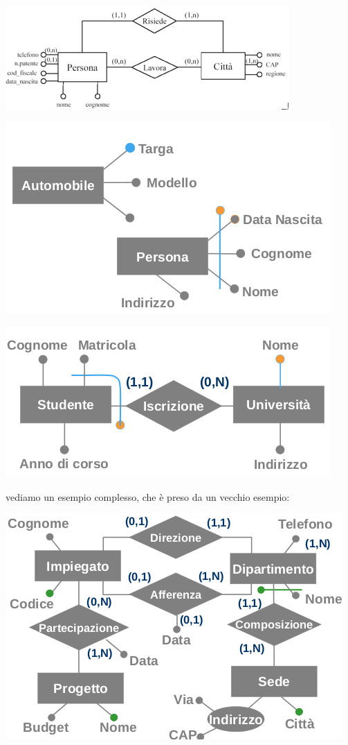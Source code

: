 \documentclass[a4paper,12pt, oneside]{book}
\begin{document}
\begin{center}
\includegraphics[scale=0.8]{img/er11.png}
\end{center}
\begin{center}
\includegraphics[scale=0.8]{img/er12.png}
\end{center}
\begin{center}
\includegraphics[scale=0.8]{img/er13.png}
\end{center}
vediamo un esempio complesso, che è preso da un vecchio esempio:
\begin{center}
\includegraphics[scale=0.8]{img/er14.png}
\end{center}
\end{document}
